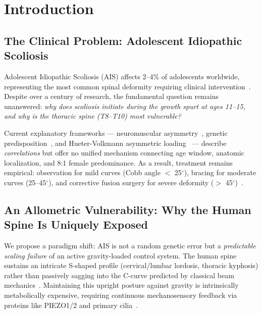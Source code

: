 
\section{Introduction}

\subsection{The Clinical Problem: Adolescent Idiopathic Scoliosis}
Adolescent Idiopathic Scoliosis (AIS) affects 2--4\% of adolescents worldwide, representing the most common spinal deformity requiring clinical intervention~\cite{weinstein2008adolescent, negrini2018scientific}. Despite over a century of research, the fundamental question remains unanswered: \textit{why does scoliosis initiate during the growth spurt at ages 11--15, and why is the thoracic spine (T8--T10) most vulnerable?}

Current explanatory frameworks --- neuromuscular asymmetry~\cite{cheng2015ais}, genetic predisposition~\cite{grauers2012genetics}, and Hueter-Volkmann asymmetric loading~\cite{stokes2006hueter} --- describe \textit{correlations} but offer no unified mechanism connecting age window, anatomic localization, and 8:1 female predominance. As a result, treatment remains empirical: observation for mild curves (Cobb angle $<$ 25$^{\circ}$), bracing for moderate curves (25--45$^{\circ}$), and corrective fusion surgery for severe deformity ($>$ 45$^{\circ}$)~\cite{weinstein2013bracing}.

\subsection{An Allometric Vulnerability: Why the Human Spine Is Uniquely Exposed}
We propose a paradigm shift: AIS is not a random genetic error but a \textit{predictable scaling failure} of an active gravity-loaded control system. The human spine sustains an intricate S-shaped profile (cervical/lumbar lordosis, thoracic kyphosis) rather than passively sagging into the C-curve predicted by classical beam mechanics~\cite{white1990clinical, goriely2017mathematics}. Maintaining this upright posture against gravity is intrinsically metabolically expensive, requiring continuous mechanosensory feedback via proteins like PIEZO1/2 and primary cilia~\cite{assaraf2020piezo2, coste2010piezo, lv2023yap}.

